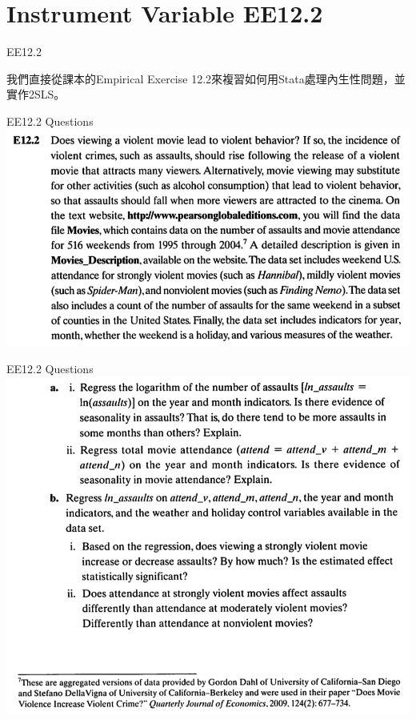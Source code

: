 \section{Instrument Variable EE12.2}

\begin{frame}[fragile]{EE12.2}

我們直接從課本的Empirical Exercise 12.2來複習如何用Stata處理內生性問題，並實作2SLS。

\end{frame}

\begin{frame}[fragile]{EE12.2 Questions}
\includegraphics[width=1\textwidth]{Images/EE12-2_1.png}
\end{frame}
\begin{frame}[fragile]{EE12.2 Questions}
\includegraphics[width=1\textwidth]{Images/EE12-2_2.png}
\end{frame}
